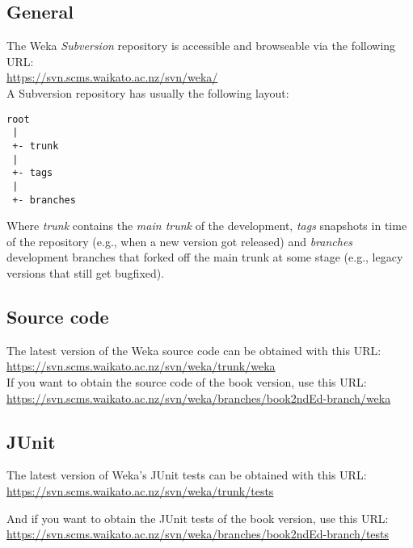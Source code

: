 \subsection{General}
The Weka \textit{Subversion} repository is accessible and browseable via the following URL:\\

\url{https://svn.scms.waikato.ac.nz/svn/weka/}{}\\

\noindent A Subversion repository has usually the following layout:

\begin{verbatim}
root
 |
 +- trunk
 |
 +- tags
 |
 +- branches
\end{verbatim}

\noindent Where \textit{trunk} contains the \textit{main trunk} of the
development, \textit{tags} snapshots in time of the repository (e.g.,
when a new version got released) and \textit{branches} development branches
that forked off the main trunk at some stage (e.g., legacy versions
that still get bugfixed).

\subsection{Source code}
The latest version of the Weka source code can be obtained with this URL:\\

\url{https://svn.scms.waikato.ac.nz/svn/weka/trunk/weka}{}\\

\noindent If you want to obtain the source code of the book version, use this URL:\\

\url{https://svn.scms.waikato.ac.nz/svn/weka/branches/book2ndEd-branch/weka}{}\\

\subsection{JUnit}
The latest version of Weka's JUnit tests can be obtained with this URL:\\

\url{https://svn.scms.waikato.ac.nz/svn/weka/trunk/tests}{}

\noindent And if you want to obtain the JUnit tests of the book version, use this URL:\\

\url{https://svn.scms.waikato.ac.nz/svn/weka/branches/book2ndEd-branch/tests}{}

